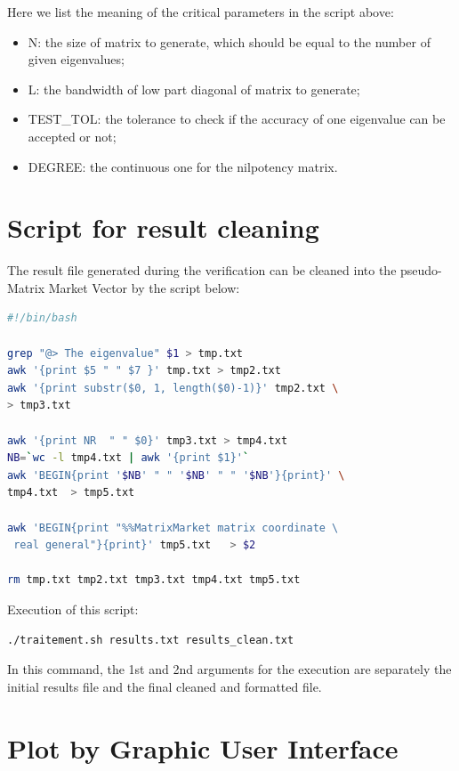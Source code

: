 \documentclass[a4paper, 10 pt]{report}
\begin{document}
	Here we list the meaning of the critical parameters in the script above:
	
	\begin{itemize}
		\item N: the size of matrix to generate, which should be equal to the number of given eigenvalues;
		\item L: the bandwidth of low part diagonal of matrix to generate;
		\item TEST\_TOL: the tolerance to check if the accuracy of one eigenvalue can be accepted or not;
		\item DEGREE: the continuous one for the nilpotency matrix.
	\end{itemize}
	\section{Script for result cleaning}
	
	The result file generated during the verification can be cleaned into the pseudo-Matrix Market Vector by the script below:
	
	\begin{lstlisting}[language=bash,frame=single]
#!/bin/bash

grep "@> The eigenvalue" $1 > tmp.txt
awk '{print $5 " " $7 }' tmp.txt > tmp2.txt
awk '{print substr($0, 1, length($0)-1)}' tmp2.txt \
> tmp3.txt

awk '{print NR  " " $0}' tmp3.txt > tmp4.txt
NB=`wc -l tmp4.txt | awk '{print $1}'`
awk 'BEGIN{print '$NB' " " '$NB' " " '$NB'}{print}' \
tmp4.txt  > tmp5.txt

awk 'BEGIN{print "%%MatrixMarket matrix coordinate \
 real general"}{print}' tmp5.txt   > $2

rm tmp.txt tmp2.txt tmp3.txt tmp4.txt tmp5.txt
   \end{lstlisting}
		
	Execution of this script:
	
	\begin{lstlisting}[language=bash,frame=single]
   ./traitement.sh results.txt results_clean.txt
	\end{lstlisting}
	
    In this command, the 1st and 2nd arguments for the execution are separately the initial results file and the final cleaned and formatted file.
	
	\section{Plot by Graphic User Interface}
\end{document}
